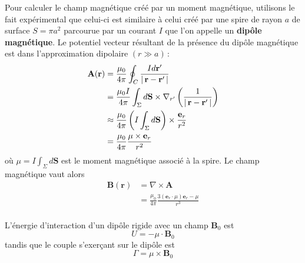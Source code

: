         Pour calculer le champ magnétique créé par un moment magnétique, utilisons le fait expérimental que celui-ci est similaire à celui créé par une spire de rayon $a$ de surface $S= \pi a^2$ parcourue par un courant $I$ que l’on appelle un \textbf{dipôle magnétique}. Le potentiel vecteur résultant de la présence du dipôle magnétique est dans l’approximation dipolaire $(r \gg a)$ :
        \begin{align*}
            \mathbf{A}(\mathbf{r}) 
            &= \frac{\mu_0}{4\pi} \oint_{C} \frac{I d\mathbf{r}'}{\left\lvert \, \mathbf{r} - \mathbf{r}' \, \right\rvert} \\
            &= \frac{\mu_0 I}{4 \pi} \int_{\Sigma} d\mathbf{S} \times \nabla_{r'} \left(\frac{1}{\left\lvert \, \mathbf{r} - \mathbf{r}' \, \right\rvert}\right) \\
            &\approx \frac{\mu_0}{4\pi} \left(I \int_{\Sigma} d \mathbf{S}\right) \times \frac{\mathbf{e}_r}{r^2} \\ 
            &= \frac{\mu_0}{4\pi} \frac{\mu \times \mathbf{e}_r}{r^2}
        \end{align*}
        où $\mu = I \int_{\Sigma} d \mathbf{S}$ est le moment magnétique associé à la spire. Le champ magnétique vaut alors 
        \begin{align*}
            \mathbf{B}(\mathbf{r}) 
            &= \nabla \times \mathbf{A} \\
            &= \frac{\mu_0}{4\pi} \frac{3(\mathbf{e}_r \cdot \mu)\mathbf{e}_r - \mu}{r^3} \\
        \end{align*}

        L’énergie d’interaction d’un dipôle rigide avec un champ $\mathbf{B}_0$ est 
        \[ U = - \mu \cdot \mathbf{B}_0 \]
        tandis que le couple s’exerçant sur le dipôle est 
        \[ \Gamma = \mu \times \mathbf{B}_0 \]

